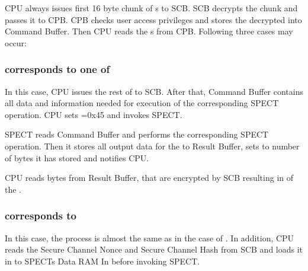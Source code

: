 
\newpage
{}

CPU always issues first 16 byte chunk of \LLLCMD{}s  to SCB. SCB decrypts
the chunk and passes it to CPB. CPB checks user access privileges and stores the decrypted
 into Command Buffer. Then CPU reads the \LLLCMD{}s 
from CPB. Following three cases may occur:

\subsubsection*{ corresponds to one of }

In this case, CPU issues the rest of  to SCB. After that, Command Buffer
contains all data and information needed for execution of the corresponding \linebreak SPECT
operation. CPU sets =0x45 and invokes SPECT.

SPECT reads Command Buffer and performs the corresponding SPECT operation. Then it stores all output
data for the \LLLRES{} to Result Buffer, sets \linebreak {} to number
of bytes it has stored and notifies CPU.

CPU reads  bytes from Result Buffer, that are encrypted by SCB
resulting in  of the \LLLRES{}.

\subsubsection*{ corresponds to }

In this case, the process is almost the same as in the case of . In addition, CPU reads
the Secure Channel Nonce and Secure Channel Hash from SCB and loads it in to SPECTs Data RAM In before
invoking SPECT.

